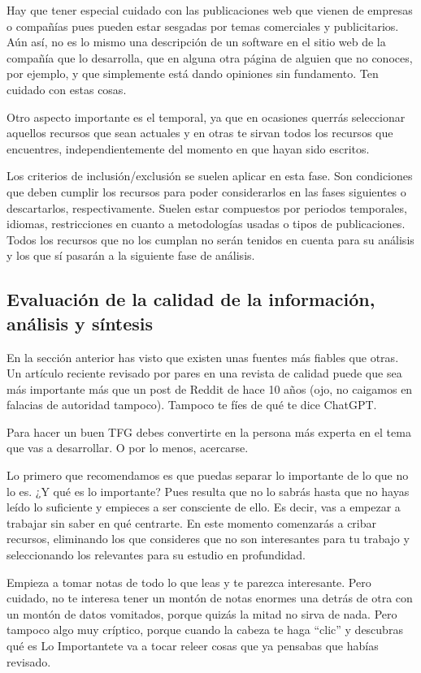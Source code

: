 Hay que tener especial cuidado con las publicaciones web que vienen de empresas o compañías pues pueden estar sesgadas por temas comerciales y publicitarios. Aún así, no es lo mismo una descripción de un software en el sitio web de la compañía que lo desarrolla, que en alguna otra página de alguien que no conoces, por ejemplo, y que simplemente está dando opiniones sin fundamento. Ten cuidado con estas cosas.  

Otro aspecto importante es el temporal, ya que en ocasiones querrás seleccionar aquellos recursos que sean actuales y en otras te sirvan todos los recursos que encuentres, independientemente del momento en que hayan sido escritos. 

Los criterios de inclusión/exclusión se suelen aplicar en esta fase. Son condiciones que deben cumplir los recursos para poder considerarlos en las fases siguientes o descartarlos, respectivamente. Suelen estar compuestos por periodos temporales, idiomas, restricciones en cuanto a metodologías usadas o tipos de publicaciones. Todos los recursos que no los cumplan no serán tenidos en cuenta para su análisis y los que sí pasarán a la siguiente fase de análisis.

\subsection{Evaluación de la calidad de la información, análisis y síntesis}

En la sección anterior has visto que existen unas fuentes más fiables que otras. Un artículo reciente revisado por pares en una revista de calidad puede que sea más importante más que un post de Reddit de hace 10 años (ojo, no caigamos en falacias de autoridad tampoco). Tampoco te fíes de qué te dice ChatGPT.

Para hacer un buen TFG debes convertirte en la persona más experta en el tema que vas a desarrollar. O por lo menos, acercarse.

Lo primero que recomendamos es que puedas separar lo importante de lo que no lo es. ¿Y qué es lo importante?  Pues resulta que no lo sabrás hasta que no hayas leído lo suficiente y empieces a ser consciente de ello. Es decir, vas a empezar a trabajar sin saber en qué centrarte. En este momento comenzarás a cribar recursos, eliminando los que consideres que no son interesantes para tu trabajo y seleccionando los relevantes para su estudio en profundidad.

Empieza a tomar notas de todo lo que leas y te parezca interesante. Pero cuidado, no te interesa tener un montón de notas enormes una detrás de otra con un montón de datos vomitados, porque quizás la mitad no sirva de nada. Pero tampoco algo muy críptico, porque cuando la cabeza te haga ``clic'' y descubras qué es Lo Importante\texttrademark  te va a tocar releer cosas que ya pensabas que habías revisado. 

